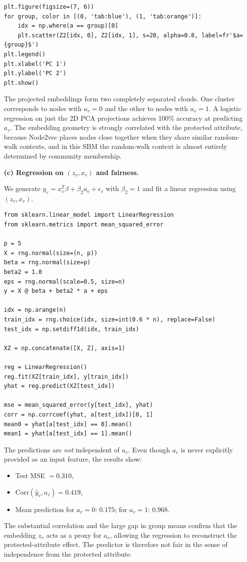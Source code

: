\documentclass{article}
\begin{document}
\begin{tcolorbox}[colback=white, colframe=black!75, breakable, title=\textbf{Solution to Exercise 3}]
\begin{lstlisting}[style=python2]
plt.figure(figsize=(7, 6))
for group, color in [(0, 'tab:blue'), (1, 'tab:orange')]:
    idx = np.where(a == group)[0]
    plt.scatter(Z2[idx, 0], Z2[idx, 1], s=20, alpha=0.8, label=fr'$a={group}$')
plt.legend()
plt.xlabel('PC 1')
plt.ylabel('PC 2')
plt.show()
\end{lstlisting}

The projected embeddings form two completely separated clouds. One cluster corresponds to nodes with $a_v=0$ and the other to nodes with $a_v=1$. A logistic regression on just the 2D PCA projections achieves 100\% accuracy at predicting $a_v$. The embedding geometry is strongly correlated with the protected attribute, because Node2vec places nodes close together when they share similar random-walk contexts, and in this SBM the random-walk context is almost entirely determined by community membership.

\bigskip
\textbf{(c) Regression on $(z_v,x_v)$ and fairness.}

We generate $y_v=x_v^T\beta+\beta_2 a_v+\epsilon_v$ with $\beta_2=1$ and fit a linear regression using $(z_v,x_v)$.

\begin{lstlisting}[style=python2]
from sklearn.linear_model import LinearRegression
from sklearn.metrics import mean_squared_error

p = 5
X = rng.normal(size=(n, p))
beta = rng.normal(size=p)
beta2 = 1.0
eps = rng.normal(scale=0.5, size=n)
y = X @ beta + beta2 * a + eps

idx = np.arange(n)
train_idx = rng.choice(idx, size=int(0.6 * n), replace=False)
test_idx = np.setdiff1d(idx, train_idx)

XZ = np.concatenate([X, Z], axis=1)

reg = LinearRegression()
reg.fit(XZ[train_idx], y[train_idx])
yhat = reg.predict(XZ[test_idx])

mse = mean_squared_error(y[test_idx], yhat)
corr = np.corrcoef(yhat, a[test_idx])[0, 1]
mean0 = yhat[a[test_idx] == 0].mean()
mean1 = yhat[a[test_idx] == 1].mean()
\end{lstlisting}

The predictions are \emph{not} independent of $a_v$. Even though $a_v$ is never explicitly provided as an input feature, the results show:
\begin{itemize}
    \item Test MSE $= 0.310$,
    \item $\text{Corr}(\hat y_v, a_v) = 0.419$,
    \item Mean prediction for $a_v=0$: $0.175$; for $a_v=1$: $0.968$.
\end{itemize}
The substantial correlation and the large gap in group means confirm that the embedding $z_v$ acts as a proxy for $a_v$, allowing the regression to reconstruct the protected-attribute effect. The predictor is therefore not fair in the sense of independence from the protected attribute.


\end{tcolorbox}
\end{document}

